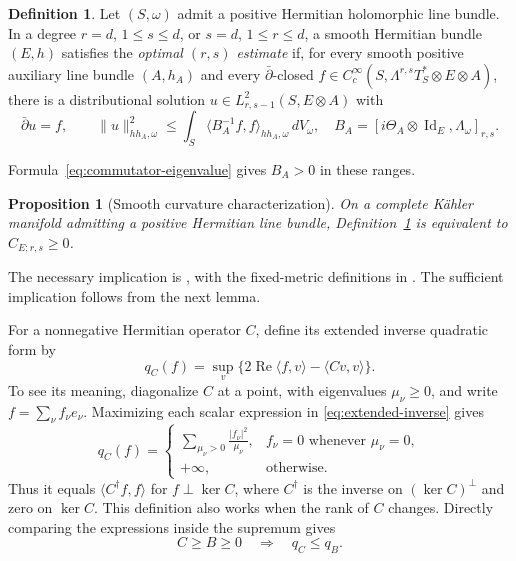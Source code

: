 \documentclass[11pt,reqno]{amsart}
\numberwithin{equation}{section}
\newtheorem{proposition}[theorem]{Proposition}
\theoremstyle{definition}
\newtheorem{definition}[theorem]{Definition}
\theoremstyle{remark}
\newcommand{\Id}{\operatorname{Id}}
\begin{document}
\begin{definition}\label{def:smooth-optimal}
Let $(S,\omega)$ admit a positive Hermitian holomorphic line bundle.
In a degree $r=d$, $1\le s\le d$, or $s=d$, $1\le r\le d$,
a smooth Hermitian bundle $(E,h)$ satisfies the \emph{optimal $(r,s)$
estimate} if, for every smooth positive auxiliary line bundle $(A,h_A)$
and every $\bar\partial$-closed $f\in C_c^\infty(S,\Lambda^{r,s}T_S^*
\otimes E\otimes A)$, there is a distributional solution
$u\in L^2_{r,s-1}(S,E\otimes A)$ with
\begin{equation}\label{eq:optimal-bound}
 \bar\partial u=f,\qquad
 \|u\|_{h h_A,\omega}^2\le
 \int_S\langle B_A^{-1}f,f\rangle_{h h_A,\omega}\,dV_\omega,
 \quad B_A=[i\Theta_A\otimes\Id_E,\Lambda_\omega]_{r,s}.
\end{equation}
\end{definition}
Formula~\eqref{eq:commutator-eigenvalue} gives $B_A>0$ in these ranges.

\begin{proposition}[Smooth curvature characterization]\label{prop:smooth-test}
On a complete K\"ahler manifold admitting a positive Hermitian line
bundle, Definition~\ref{def:smooth-optimal} is equivalent to
$C_{E;r,s}\ge0$.
\end{proposition}
The necessary implication is \cite[Theorems 1.5--1.6]{WatCurv}, with the
fixed-metric definitions in \cite[Definitions 1.3--1.4]{WatCurv}.
The sufficient implication follows from the next lemma.

For a nonnegative Hermitian operator $C$, define its extended inverse
quadratic form by
\begin{equation}\label{eq:extended-inverse}
 q_C(f)=\sup_v\{2\operatorname{Re}\langle f,v\rangle
                         -\langle Cv,v\rangle\}.
\end{equation}
To see its meaning, diagonalize $C$ at a point, with eigenvalues
$\mu_\nu\ge0$, and write $f=\sum_\nu f_\nu e_\nu$.  Maximizing each
scalar expression in \eqref{eq:extended-inverse} gives
\[
 q_C(f)=
 \begin{cases}
 \displaystyle\sum_{\mu_\nu>0}\frac{|f_\nu|^2}{\mu_\nu},
       &f_\nu=0\text{ whenever }\mu_\nu=0,\\[4pt]
 +\infty,&\text{otherwise}.
 \end{cases}
\]
Thus it equals $\langle C^\dagger f,f\rangle$ for
$f\perp\ker C$, where $C^\dagger$ is the inverse on $(\ker C)^\perp$
and zero on $\ker C$.  This definition also works when the rank of
$C$ changes.  Directly comparing the expressions inside the supremum gives
\begin{equation}\label{eq:inverse-order}
 C\ge B\ge0\quad\Longrightarrow\quad q_C\le q_B.
\end{equation}
\end{document}
